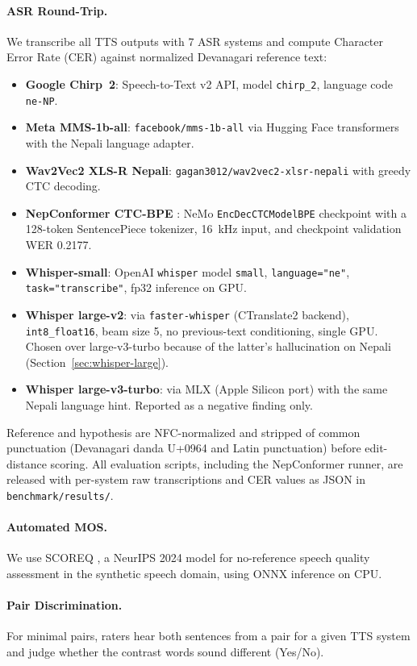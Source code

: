 \documentclass[11pt]{article}
\begin{document}
\paragraph{ASR Round-Trip.} We transcribe all TTS outputs with 7 ASR systems and compute Character Error Rate (CER) against normalized Devanagari reference text:
\begin{itemize}
\item \textbf{Google Chirp~2}: Speech-to-Text v2 API, model \texttt{chirp\_2}, language code \texttt{ne-NP}.
\item \textbf{Meta MMS-1b-all}: \texttt{facebook/mms-1b-all} via Hugging Face transformers with the Nepali language adapter.
\item \textbf{Wav2Vec2 XLS-R Nepali}: \texttt{gagan3012/wav2vec2-xlsr-nepali} with greedy CTC decoding.
\item \textbf{NepConformer CTC-BPE} \citep{poudel2026nepconformer}: NeMo \texttt{EncDecCTCModelBPE} checkpoint with a 128-token SentencePiece tokenizer, 16~kHz input, and checkpoint validation WER 0.2177.
\item \textbf{Whisper-small}: OpenAI \texttt{whisper} model \texttt{small}, \texttt{language="ne"}, \texttt{task="transcribe"}, fp32 inference on GPU.
\item \textbf{Whisper large-v2}: via \texttt{faster-whisper} (CTranslate2 backend), \texttt{int8\_float16}, beam size 5, no previous-text conditioning, single GPU. Chosen over large-v3-turbo because of the latter's hallucination on Nepali (Section~\ref{sec:whisper-large}).
\item \textbf{Whisper large-v3-turbo}: via MLX (Apple Silicon port) with the same Nepali language hint. Reported as a negative finding only.
\end{itemize}
Reference and hypothesis are NFC-normalized and stripped of common punctuation (Devanagari danda U+0964 and Latin punctuation) before edit-distance scoring. All evaluation scripts, including the NepConformer runner, are released with per-system raw transcriptions and CER values as JSON in \texttt{benchmark/results/}.

\paragraph{Automated MOS.} We use SCOREQ \citep{ragano2024scoreq}, a NeurIPS 2024 model for no-reference speech quality assessment in the synthetic speech domain, using ONNX inference on CPU.

\paragraph{Pair Discrimination.} For minimal pairs, raters hear both sentences from a pair for a given TTS system and judge whether the contrast words sound different (Yes/No).
\end{document}
